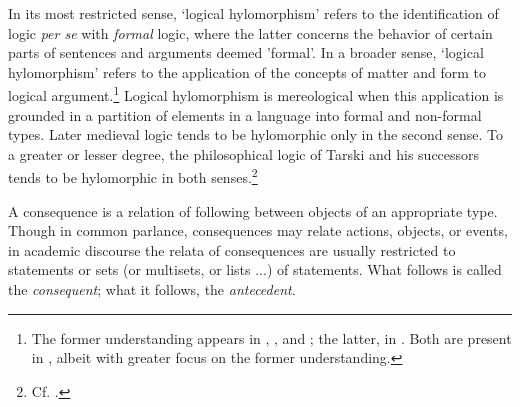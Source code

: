 \documentclass[]{article}
\begin{document}
In its most restricted sense, `logical hylomorphism' refers to the identification of logic \textit{per se} with \textit{formal} logic, where the latter concerns the behavior of certain parts of sentences and arguments deemed 'formal'. In a broader sense, `logical hylomorphism' refers to the application of the concepts of matter and form to logical argument.\footnote{The former understanding appears in \autocite{MacFarlane2000}, \autocite{BeallRestall2006}, and \autocite{Griffiths2013}; the latter, in \autocite{Brumberg-Chaumont2015}. Both are present in \autocite{DutilhNovaes2011,DutilhNovaes2012b,DutilhNovaes2012c}, albeit with greater focus on the former understanding.} Logical hylomorphism is mereological when this application is grounded in a partition of elements in a language into formal and non-formal types. Later medieval logic tends to be hylomorphic only in the second sense. To a greater or lesser degree, the philosophical logic of Tarski and his successors tends to be hylomorphic in both senses.\footnote{Cf. \autocite{Tarski2002,Tarski1986,Sher1991,Ray1996,Gomez-Torrente2000,Bellotti2003,BeallRestall2006,MacFarlane2009}.}

A consequence is a relation of following between objects of an appropriate type. Though in common parlance, consequences may relate actions, objects, or events, in academic discourse the relata of consequences are usually restricted to statements or sets (or multisets, or lists ...) of statements. What follows is called the \textit{consequent}; what it follows, the \textit{antecedent}.
\end{document}
